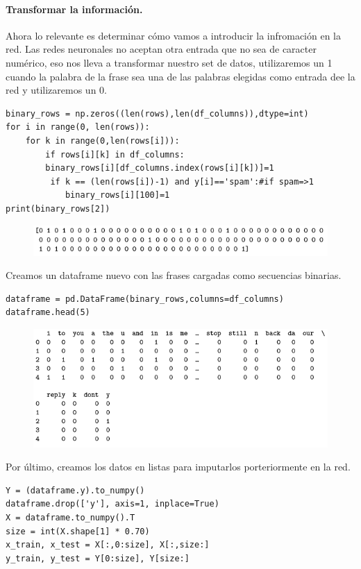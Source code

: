 \documentclass[a4paper,10pt]{article}
\begin{document}
\paragraph{Transformar la información.}
Ahora lo relevante es determinar cómo vamos a introducir la infromación en la red. Las redes neuronales no aceptan otra entrada que no sea de caracter numérico, eso nos lleva a transformar nuestro set de datos, utilizaremos un 1 cuando la palabra de la frase sea una de las palabras elegidas como entrada dee la red y utilizaremos un 0.
\begin{lstlisting}
binary_rows = np.zeros((len(rows),len(df_columns)),dtype=int) 
for i in range(0, len(rows)): 
    for k in range(0,len(rows[i])):
        if rows[i][k] in df_columns: 
	    binary_rows[i][df_columns.index(rows[i][k])]=1
         if k == (len(rows[i])-1) and y[i]=='spam':#if spam=>1 
            binary_rows[i][100]=1
print(binary_rows[2])
\end{lstlisting}
\begin{figure}[H]
\centering
\includegraphics[scale=0.83]{Annotation 2020-03-23 182035.png}
\end{figure}
Creamos un dataframe nuevo con las frases cargadas como secuencias binarias.
\begin{lstlisting}
dataframe = pd.DataFrame(binary_rows,columns=df_columns) 
dataframe.head(5)
\end{lstlisting}
\begin{figure}[H]
\centering
\includegraphics[scale=0.83]{Annotation 2020-03-23 182154.png}
\end{figure}
Por último, creamos los datos en listas para imputarlos porteriormente en la red.
\begin{lstlisting}
Y = (dataframe.y).to_numpy() 
dataframe.drop(['y'], axis=1, inplace=True)
X = dataframe.to_numpy().T 
size = int(X.shape[1] * 0.70) 
x_train, x_test = X[:,0:size], X[:,size:] 
y_train, y_test = Y[0:size], Y[size:]
\end{lstlisting}
\end{document}
